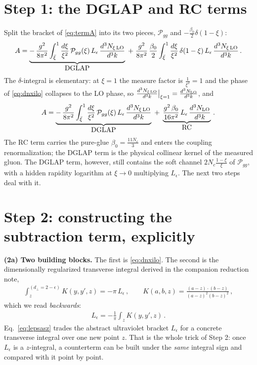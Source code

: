 \documentclass[10pt]{article}
\newcommand{\Leps}{L_{\epsilon}}
\begin{document}
\section{Step 1: the DGLAP and RC terms}
Split the bracket of \eqref{eq:termA} into its two pieces, $\mathcal P_{gg}$ and
$-\frac{\beta_{0}}{2}\delta(1-\xi)$:
\begin{align}
A=\underbrace{-\,\frac{g^{2}}{8\pi^{2}}\int_{\bar\xi}^{1}\frac{d\xi}{\xi^{2}}\,\mathcal P_{gg}(\xi)\,\Leps\,\frac{d^{3}N_{\xi\,\rm LO}}{d^{3}k}}_{\textstyle\rm DGLAP}
\;+\;\frac{g^{2}}{8\pi^{2}}\,\frac{\beta_{0}}{2}\int_{\bar\xi}^{1}\frac{d\xi}{\xi^{2}}\,\delta(1-\xi)\,\Leps\,\frac{d^{3}N_{\xi\,\rm LO}}{d^{3}k}\,.
\end{align}
The $\delta$-integral is elementary: at $\xi=1$ the measure factor is $\frac{1}{\xi^{2}}=1$ and
the phase of \eqref{eq:dnxilo} collapses to the LO phase, so
$\frac{d^{3}N_{\xi\,\rm LO}}{d^{3}k}\big|_{\xi=1}=\frac{d^{3}N_{\rm LO}}{d^{3}k}$, and
\begin{align}\label{eq:rc}
A=\underbrace{-\,\frac{g^{2}}{8\pi^{2}}\int_{\bar\xi}^{1}\frac{d\xi}{\xi^{2}}\,\mathcal P_{gg}(\xi)\,\Leps\,\frac{d^{3}N_{\xi\,\rm LO}}{d^{3}k}}_{\textstyle\rm DGLAP}
\;+\;\underbrace{\frac{g^{2}\,\beta_{0}}{16\pi^{2}}\,\Leps\,\frac{d^{3}N_{\rm LO}}{d^{3}k}}_{\textstyle\rm RC}\,.
\end{align}
The RC term carries the pure-glue $\beta_{0}=\frac{11N_{c}}{3}$ and enters the coupling
renormalization; the DGLAP term is the physical collinear kernel of the measured gluon. The
DGLAP term, however, still contains the soft channel $2N_{c}\frac{1-\xi}{\xi}$ of
$\mathcal P_{gg}$, with a hidden rapidity logarithm at $\xi\to0$ multiplying $\Leps$. The next
two steps deal with it.

\section{Step 2: constructing the subtraction term, explicitly}

\textbf{(2a) Two building blocks.} The first is \eqref{eq:dnxilo}. The second is the
dimensionally regularized transverse integral derived in the companion reduction note,
\begin{align}\label{eq:zint}
\int_{z}^{(d_{\perp}=2-\epsilon)} K(y,y',z)=-\pi\,\Leps\,,\qquad
K(a,b,z)=\frac{(a-z)\cdot(b-z)}{(a-z)^{2}(b-z)^{2}}\,,
\end{align}
which we read \emph{backwards}:
\begin{align}\label{eq:lepsasz}
\Leps=-\frac{1}{\pi}\int_{z}K(y,y',z)\,.
\end{align}
Eq.~\eqref{eq:lepsasz} trades the abstract ultraviolet bracket $\Leps$ for a concrete
transverse integral over one new point $z$. That is the whole trick of Step 2: once $\Leps$ is
a $z$-integral, a counterterm can be built under the \emph{same} integral sign and compared
with it point by point.
\end{document}
